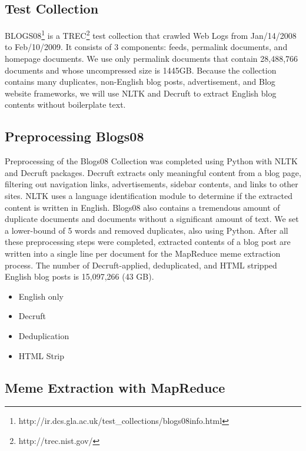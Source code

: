 \documentclass{sig-alternate}
\begin{document}
\subsection{Test Collection}

BLOGS08\footnote{http://ir.dcs.gla.ac.uk/test\_collections/blogs08info.html} is a TREC\footnote{http://trec.nist.gov/} test collection that crawled Web Logs from Jan/14/2008 to Feb/10/2009. It consists of 3 components: feeds, permalink documents, and homepage documents. We use only permalink documents that contain 28,488,766 documents and whose uncompressed size is 1445GB. Because the collection contains many duplicates, non-English blog posts, advertisement, and Blog website frameworks, we will use NLTK and Decruft to extract English blog contents without boilerplate text.

\subsection{Preprocessing Blogs08}

Preprocessing of the Blogs08 Collection was completed using Python with NLTK and Decruft packages. Decruft extracts only meaningful content from a blog page, filtering out navigation links, advertisements, sidebar contents, and links to other sites. NLTK uses a language identification module to determine if the extracted content is written in English. Blogs08 also contains a tremendous amount of duplicate documents and documents without a significant amount of text. We set a lower-bound of 5 words and removed duplicates, also using Python. After all these preprocessing steps were completed, extracted contents of a blog post are written into a single line per document for the MapReduce meme extraction process. The number of Decruft-applied, deduplicated, and HTML stripped English blog posts is 15,097,266 (43 GB).

\begin{itemize}
\item English only
\item Decruft
\item Deduplication
\item HTML Strip
\end{itemize}


\subsection{Meme Extraction with MapReduce}
\end{document}
